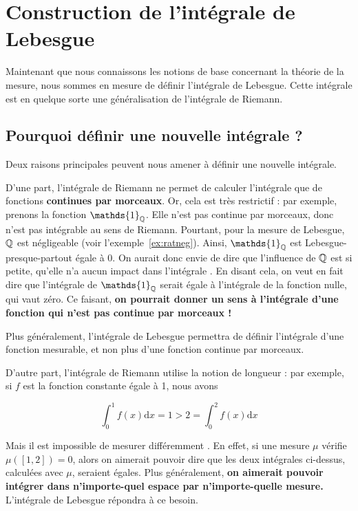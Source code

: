 \documentclass[../integ-proba.tex]{subfiles}
\begin{document}
  \chapter{Construction de l'intégrale de Lebesgue}

  Maintenant que nous connaissons les notions de base concernant la théorie de la mesure, nous sommes en mesure de définir l'intégrale de Lebesgue.
  Cette intégrale est en quelque sorte une généralisation de l'intégrale de Riemann.

  \section{Pourquoi définir une nouvelle intégrale ?}

  Deux raisons principales peuvent nous amener à définir une nouvelle intégrale.

  D'une part, l'intégrale de Riemann ne permet de calculer l'intégrale que de fonctions \textbf{continues par morceaux}.
  Or, cela est très restrictif : par exemple, prenons la fonction $\mathds{1}_{\Q}$.
  Elle n'est pas continue par morceaux, donc n'est pas intégrable au sens de Riemann.
  Pourtant, pour la mesure de Lebesgue, $\mathbb{Q}$ est négligeable (voir l'exemple~\ref{ex:ratneg}).
  Ainsi, $\mathds{1}_{\Q}$ est Lebesgue-presque-partout égale à $0$.
  On aurait donc envie de dire que \og l'influence de $\mathbb{Q}$ est si petite, qu'elle n'a aucun impact dans l'intégrale \fg.
  En disant cela, on veut en fait dire que l'intégrale de $\mathds{1}_{\Q}$ serait égale à l'intégrale de la fonction nulle, qui vaut zéro.
  Ce faisant, \textbf{on pourrait donner un sens à l'intégrale d'une fonction qui n'est pas continue par morceaux !}

  Plus généralement, l'intégrale de Lebesgue permettra de définir l'intégrale d'une fonction mesurable, et non plus d'une fonction continue par morceaux.

  D'autre part, l'intégrale de Riemann utilise la notion de longueur :
  par exemple, si $f$ est la fonction constante égale à 1, nous avons

  \begin{displaymath}
    \int_0^1 f(x)\text{d}x = 1 > 2 = \int_0^2 f(x)\text{d}x
  \end{displaymath}


  Mais il est impossible de \og mesurer différemment \fg.
  En effet, si une mesure $\mu$ vérifie $\mu\left(\left[1,2\right]\right)=0$, alors on aimerait pouvoir dire que les deux intégrales ci-dessus, calculées avec $\mu$, seraient égales.
  Plus généralement, \textbf{on aimerait pouvoir intégrer dans n'importe-quel espace par n'importe-quelle mesure.}
  L'intégrale de Lebesgue répondra à ce besoin.
\end{document}
